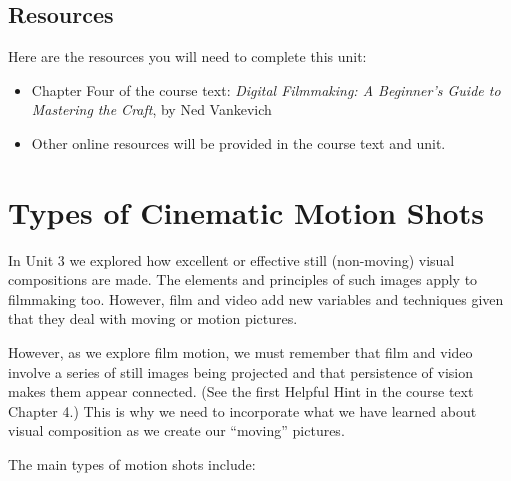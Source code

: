\documentclass[
]{book}
\providecommand{\tightlist}{%
  \setlength{\itemsep}{0pt}\setlength{\parskip}{0pt}}
\begin{document}
\hypertarget{resources-3}{%
\subsection*{Resources}\label{resources-3}}

Here are the resources you will need to complete this unit:

\begin{itemize}
\tightlist
\item
  Chapter Four of the course text: \emph{Digital Filmmaking: A Beginner's Guide to Mastering the Craft}, by Ned Vankevich
\item
  Other online resources will be provided in the course text and unit.
\end{itemize}

\hypertarget{types-of-cinematic-motion-shots}{%
\section{Types of Cinematic Motion Shots}\label{types-of-cinematic-motion-shots}}

In Unit 3 we explored how excellent or effective still (non-moving) visual compositions are made. The elements and principles of such images apply to filmmaking too. However, film and video add new variables and techniques given that they deal with moving or motion pictures.

However, as we explore film motion, we must remember that film and video involve a series of still images being projected and that persistence of vision makes them appear connected. (See the first Helpful Hint in the course text Chapter 4.) This is why we need to incorporate what we have learned about visual composition as we create our ``moving'' pictures.

The main types of motion shots include:
\end{document}
